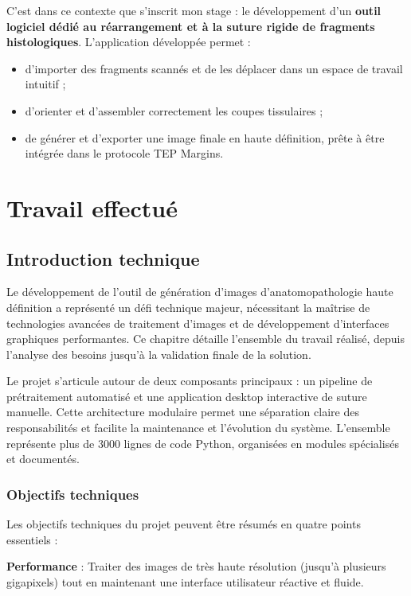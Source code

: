\documentclass[12pt,a4paper]{report}
\begin{document}
C'est dans ce contexte que s'inscrit mon stage : le développement d'un \textbf{outil logiciel dédié au réarrangement et à la suture rigide de fragments histologiques}. L'application développée permet :

\begin{itemize}
\item d'importer des fragments scannés et de les déplacer dans un espace de travail intuitif ;
\item d'orienter et d'assembler correctement les coupes tissulaires ;
\item de générer et d'exporter une image finale en haute définition, prête à être intégrée dans le protocole TEP Margins.
\end{itemize}

\chapter{Travail effectué}

\section{Introduction technique}

Le développement de l'outil de génération d'images d'anatomopathologie haute définition a représenté un défi technique majeur, nécessitant la maîtrise de technologies avancées de traitement d'images et de développement d'interfaces graphiques performantes. Ce chapitre détaille l'ensemble du travail réalisé, depuis l'analyse des besoins jusqu'à la validation finale de la solution.

Le projet s'articule autour de deux composants principaux : un pipeline de prétraitement automatisé et une application desktop interactive de suture manuelle. Cette architecture modulaire permet une séparation claire des responsabilités et facilite la maintenance et l'évolution du système. L'ensemble représente plus de 3000 lignes de code Python, organisées en modules spécialisés et documentés.

\subsection{Objectifs techniques}

Les objectifs techniques du projet peuvent être résumés en quatre points essentiels :

\textbf{Performance} : Traiter des images de très haute résolution (jusqu'à plusieurs gigapixels) tout en maintenant une interface utilisateur réactive et fluide.
\end{document}
